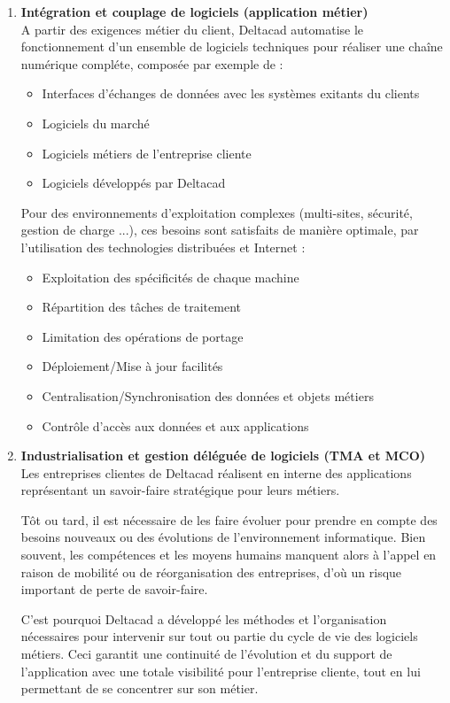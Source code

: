 \begin{enumerate}
\item \textbf{Intégration et couplage de logiciels (application métier)}\\ 
A partir des exigences métier du client, Deltacad automatise le fonctionnement d'un ensemble de logiciels techniques pour réaliser une chaîne numérique compléte, composée par exemple de :
\begin{itemize}
\item Interfaces d'échanges de données avec les systèmes exitants du clients
\item Logiciels du marché
\item Logiciels métiers de l'entreprise cliente
\item Logiciels développés par Deltacad
\end{itemize}
Pour des environnements d'exploitation complexes (multi-sites, sécurité, gestion de charge ...), ces besoins sont satisfaits de manière optimale, par l'utilisation des technologies distribuées et Internet :
\begin{itemize}
\item Exploitation des spécificités de chaque machine
\item Répartition des tâches de traitement
\item Limitation des opérations de portage
\item Déploiement/Mise à jour facilités
\item Centralisation/Synchronisation des données et objets métiers
\item Contrôle d'accès aux données et aux applications
\end{itemize}
\item \textbf{Industrialisation et gestion déléguée de logiciels (TMA et MCO)}\\ 
Les entreprises clientes de Deltacad réalisent en interne des applications représentant un savoir-faire stratégique pour leurs métiers.

Tôt ou tard, il est nécessaire de les faire évoluer pour prendre en compte des besoins nouveaux ou des évolutions de l'environnement informatique. Bien souvent, les compétences et les moyens humains manquent alors à l'appel en raison de mobilité ou de réorganisation des entreprises, d'où un risque important de perte de savoir-faire.

C'est pourquoi Deltacad a développé les méthodes et l'organisation nécessaires pour intervenir sur tout ou partie du cycle de vie des logiciels métiers. Ceci garantit une continuité de l'évolution et du support de l'application avec une totale visibilité pour l'entreprise cliente, tout en lui  permettant de se concentrer sur son métier.


\end{enumerate}
